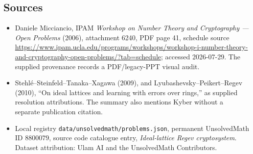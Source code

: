\documentclass[11pt]{article}
\begin{document}
\subsection{Sources}
\begin{itemize}
\item Daniele Micciancio, IPAM \emph{Workshop on Number Theory and Cryptography --- Open Problems} (2006), attachment 6240, PDF page 41, schedule source \url{https://www.ipam.ucla.edu/programs/workshops/workshop-i-number-theory-and-cryptography-open-problems/?tab=schedule}; accessed 2026-07-29. The supplied provenance records a PDF/legacy-PPT visual audit.
\item Stehl\'e--Steinfeld--Tanaka--Xagawa (2009), and Lyubashevsky--Peikert--Regev (2010), ``On ideal lattices and learning with errors over rings,'' as supplied resolution attributions. The summary also mentions Kyber without a separate publication citation.
\item Local registry \texttt{data/unsolvedmath/problems.json}, permanent UnsolvedMath ID $8800079$, source code catalogue entry, \emph{Ideal-lattice Regev cryptosystem}. Dataset attribution: Ulam AI and the UnsolvedMath Contributors.
\end{itemize}
\end{document}
